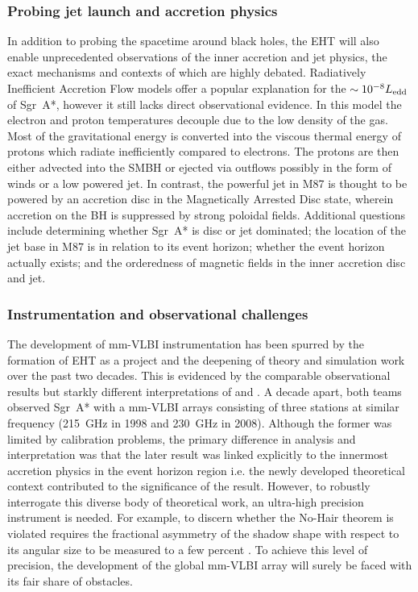 \subsubsection{Probing jet launch and accretion physics}
In addition to probing the spacetime around black holes, the EHT will also enable unprecedented observations of the inner accretion and jet physics, the exact mechanisms and contexts of which are highly debated. Radiatively Inefficient Accretion Flow \citep[(RIAF),][]{Narayan_1995,Yuan_2003} models offer a popular explanation for the $\sim 10^{-8} L_{\rm edd}$ of Sgr~A*, however it still lacks direct observational evidence. In this model the electron and proton temperatures decouple due to the low density of the gas. Most of the gravitational energy is converted into the viscous thermal energy of protons which radiate inefficiently compared to electrons. The protons are then either advected into the SMBH or ejected via outflows possibly in the form of winds or a low powered jet. In contrast, the powerful jet in M87 is thought to be powered by an accretion disc in the Magnetically Arrested Disc \citep[(MAD),][]{Narayan_2003} state, wherein accretion on the BH is suppressed by strong poloidal fields. Additional questions include determining whether Sgr~A* is disc or jet dominated; the location of the jet base in M87 is in relation to its event horizon; whether the event horizon actually exists; and the orderedness of magnetic fields in the inner accretion disc and jet.


\subsubsection{Instrumentation and observational challenges}

The development of mm-VLBI instrumentation has been spurred by the formation of EHT as a project and the deepening of theory and simulation work over the past two decades. This is evidenced by the comparable observational results but starkly different interpretations of \citet{Krichbaum_1998} and \citet{Doeleman_2008}. A decade apart, both teams observed Sgr~A* with a mm-VLBI arrays consisting of three stations at similar frequency (215~GHz in 1998 and 230~GHz in 2008). Although the former was limited by calibration problems, the primary difference in analysis and interpretation was that the later result was linked explicitly to the innermost accretion physics in the event horizon region \citep[e.g.][]{Broderick_2011} i.e. the newly developed theoretical context contributed to the significance of the \citet{Doeleman_2008} result. However, to robustly interrogate this diverse body of theoretical work, an ultra-high precision instrument is needed. For example, to discern whether the No-Hair theorem is violated requires the fractional asymmetry of the shadow shape with respect to its angular size to be measured to a few percent \citep{Goddi_2016}. To achieve this level of precision, the development of the global mm-VLBI array will surely be faced with its fair share of obstacles.

